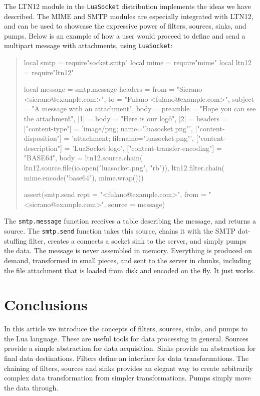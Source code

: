 \documentclass[10pt]{article}
\begin{document}
The LTN12 module in the \texttt{LuaSocket} distribution
implements the ideas we have described. The MIME
and SMTP modules are especially integrated with LTN12, 
and can be used to showcase the expressive power of filters,
sources, sinks, and pumps. Below is an example 
of how a user would proceed to define and send a
multipart message with attachments, using \texttt{LuaSocket}:
\begin{quote}
\begin{mime}
local smtp = require"socket.smtp"
local mime = require"mime"
local ltn12 = require"ltn12"

local message = smtp.message{
  headers = {
    from = "Sicrano <sicrano@example.com>",
    to = "Fulano <fulano@example.com>",
    subject = "A message with an attachment"},
  body = {
    preamble = "Hope you can see the attachment\r\n",
    [1] = {
      body = "Here is our logo\r\n"},
    [2] = {
      headers = {
        ["content-type"] = 'image/png; name="luasocket.png"',
        ["content-disposition"] = 
          'attachment; filename="luasocket.png"',
        ["content-description"] = 'LuaSocket logo',
        ["content-transfer-encoding"] = "BASE64"},
      body = ltn12.source.chain(
        ltn12.source.file(io.open("luasocket.png", "rb")),
        ltn12.filter.chain(
          mime.encode("base64"),
          mime.wrap()))}}}

assert(smtp.send{
  rcpt = "<fulano@example.com>",
  from = "<sicrano@example.com>",
  source = message})
\end{mime}
\end{quote}

The \texttt{smtp.message} function receives a table
describing the message, and returns a source. The
\texttt{smtp.send} function takes this source, chains it with the
SMTP dot-stuffing filter, creates a connects a socket sink
to the server, and simply pumps the data. The message is never 
assembled in memory.  Everything is produced on demand, 
transformed in small pieces, and sent to the server in chunks, 
including the file attachment that is loaded from disk and 
encoded on the fly. It just works.

\section{Conclusions}

In this article we introduce the concepts of filters,
sources, sinks, and pumps to the Lua language. These are
useful tools for data processing in general. Sources provide
a simple abstraction for data acquisition. Sinks provide an
abstraction for final data destinations. Filters define an
interface for data transformations.  The chaining of
filters, sources and sinks provides an elegant way to create
arbitrarily complex data transformation from simpler
transformations. Pumps simply move the data through.  
\end{document}
